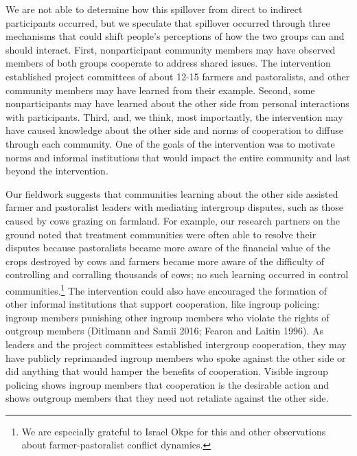 \documentclass[11pt]{article}
\begin{document}
We are not able to determine how this spillover from direct to indirect
participants occurred, but we speculate that spillover occurred through
three mechanisms that could shift people's perceptions of how the two
groups can and should interact. First, nonparticipant community members
may have observed members of both groups cooperate to address shared
issues. The intervention established project committees of about 12-15
farmers and pastoralists, and other community members may have learned
from their example. Second, some nonparticipants may have learned about
the other side from personal interactions with participants. Third, and,
we think, most importantly, the intervention may have caused knowledge
about the other side and norms of cooperation to diffuse through each
community. One of the goals of the intervention was to motivate norms
and informal institutions that would impact the entire community and
last beyond the intervention.

Our fieldwork suggests that communities learning about the other side
assisted farmer and pastoralist leaders with mediating intergroup
disputes, such as those caused by cows grazing on farmland. For example,
our research partners on the ground noted that treatment communities
were often able to resolve their disputes because pastoralists became
more aware of the financial value of the crops destroyed by cows and
farmers became more aware of the difficulty of controlling and
corralling thousands of cows; no such learning occurred in control
communities.\footnote{We are especially grateful to Israel Okpe for this
  and other observations about farmer-pastoralist conflict dynamics.}
The intervention could also have encouraged the formation of other
informal institutions that support cooperation, like ingroup policing:
ingroup members punishing other ingroup members who violate the rights
of outgroup members (Ditlmann and Samii 2016; Fearon and Laitin 1996).
As leaders and the project committees established intergroup
cooperation, they may have publicly reprimanded ingroup members who
spoke against the other side or did anything that would hamper the
benefits of cooperation. Visible ingroup policing shows ingroup members
that cooperation is the desirable action and shows outgroup members that
they need not retaliate against the other side.
\end{document}

